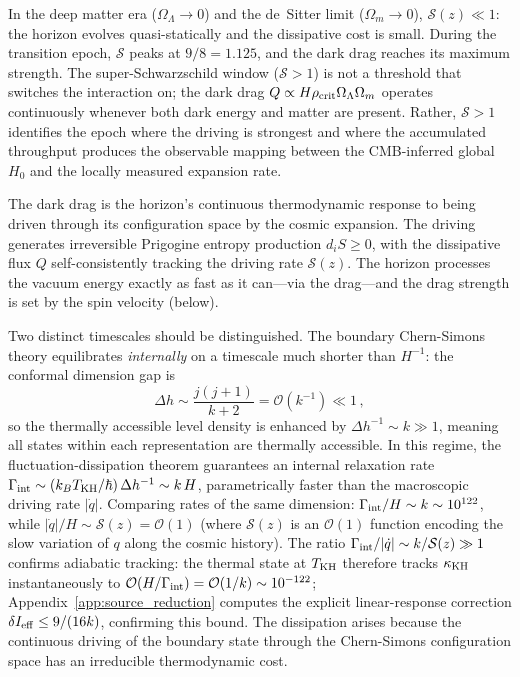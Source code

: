 \documentclass[aps,prd,twocolumn,10pt,superscriptaddress,nofootinbib]{revtex4-2}
\begin{document}
In the deep matter era ($\Omega_\Lambda \to 0$) and the de~Sitter
limit ($\Omega_m \to 0$), $\mathcal{S}(z) \ll 1$: the horizon
evolves quasi-statically and the dissipative cost is small.
During the transition epoch, $\mathcal{S}$ peaks at
$9/8 = 1.125$, and the dark drag reaches its maximum strength.
The super-Schwarzschild window ($\mathcal{S} > 1$) is not a
threshold that switches the interaction on; the dark drag
$Q \propto H\rho_{\rm crit}\Omega_\Lambda\Omega_m$ operates
continuously whenever both dark energy and matter are present.
Rather, $\mathcal{S} > 1$ identifies the epoch where the driving
is strongest and where the accumulated throughput produces the
observable mapping between the CMB-inferred global $H_0$ and the
locally measured expansion rate.

The dark drag is the horizon's continuous thermodynamic response
to being driven through its configuration space by the cosmic
expansion.  The driving generates irreversible Prigogine entropy
production $d_i S \geq 0$, with the dissipative flux $Q$
self-consistently tracking the driving rate $\mathcal{S}(z)$.
The horizon processes the vacuum energy exactly as fast as it
can---via the drag---and the drag strength is set by the spin
velocity (below).

Two distinct timescales should be distinguished.  The boundary
Chern-Simons theory equilibrates \emph{internally} on a timescale
much shorter than $H^{-1}$: the conformal dimension gap is
\begin{equation}
\Delta h \sim \frac{j(j+1)}{k+2} = \mathcal{O}(k^{-1}) \ll 1\,,
\end{equation}
so the thermally accessible level density is enhanced by
$\Delta h^{-1} \sim k \gg 1$, meaning all states within each
representation are thermally accessible.  In this regime, the
fluctuation-dissipation theorem guarantees an internal relaxation
rate $\Gamma_{\rm int} \sim (k_B T_{\rm KH}/\hbar)\,\Delta h^{-1}
\sim k\,H$, parametrically faster than the macroscopic driving
rate $|\dot{q}|$.  Comparing rates of the same dimension:
$\Gamma_{\rm int}/H \sim k \sim 10^{122}$, while
$|\dot{q}|/H \sim \mathcal{S}(z) = \mathcal{O}(1)$
(where $\mathcal{S}(z)$ is an $\mathcal{O}(1)$ function encoding
the slow variation of $q$ along the cosmic history).
The ratio $\Gamma_{\rm int}/|\dot{q}| \sim k/\mathcal{S}(z) \gg 1$
confirms adiabatic tracking: the thermal state at
$T_{\rm KH}$ therefore tracks $\kappa_{\rm KH}$ instantaneously to
$\mathcal{O}(H/\Gamma_{\rm int}) = \mathcal{O}(1/k)
\sim 10^{-122}$; Appendix~\ref{app:source_reduction} computes the
explicit linear-response correction
$\delta I_{\rm eff} \leq 9/(16k)$, confirming this bound.
The dissipation arises because the continuous
driving of the boundary state through the Chern-Simons
configuration space has an irreducible thermodynamic cost.
\end{document}
